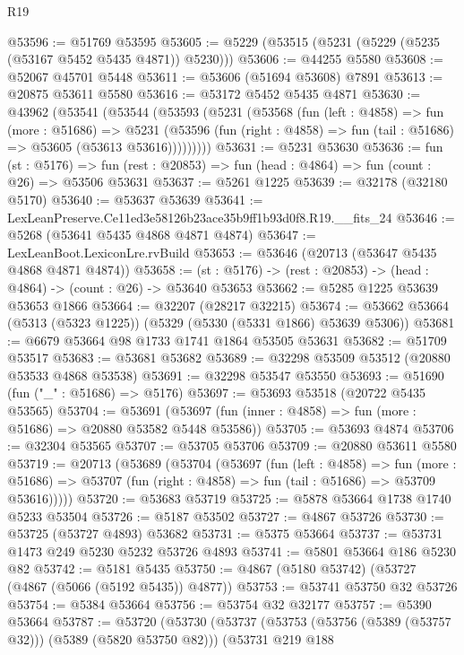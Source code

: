 \begin{lexlean}{R19}
\begin{coremodule}
@53596 := @51769 @53595
@53605 := @5229 (@53515 (@5231 (@5229 (@5235 (@53167 @5452 @5435 @4871)) @5230)))
@53606 := @44255 @5580
@53608 := @52067 @45701 @5448
@53611 := @53606 (@51694 @53608) @7891
@53613 := @20875 @53611 @5580
@53616 := @53172 @5452 @5435 @4871
@53630 := @43962
    (@53541
      (@53544
        (@53593
          (@5231
            (@53568
              (fun (left : @4858) =>
              fun (more : @51686) =>
              @5231
                (@53596
                  (fun (right : @4858) => fun (tail : @51686) => @53605 (@53613 @53616)))))))))
@53631 := @5231 @53630
@53636 := fun (st : @5176) =>
  fun (rest : @20853) => fun (head : @4864) => fun (count : @26) => @53506 @53631
@53637 := @5261 @1225
@53639 := @32178 (@32180 @5170)
@53640 := @53637 @53639
@53641 := LexLeanPreserve.Ce11ed3e58126b23ace35b9ff1b93d0f8.R19.__fits_24
@53646 := @5268 (@53641 @5435 @4868 @4871 @4874)
@53647 := LexLeanBoot.LexiconLre.rvBuild
@53653 := @53646 (@20713 (@53647 @5435 @4868 @4871 @4874))
@53658 := (st : @5176) -> (rest : @20853) -> (head : @4864) -> (count : @26) -> @53640 @53653
@53662 := @5285 @1225 @53639 @53653 @1866
@53664 := @32207 (@28217 @32215)
@53674 := @53662 @53664 (@5313 (@5323 @1225)) (@5329 (@5330 (@5331 @1866) @53639 @5306))
@53681 := @6679 @53664 @98 @1733 @1741 @1864 @53505 @53631
@53682 := @51709 @53517
@53683 := @53681 @53682
@53689 := @32298 @53509 @53512 (@20880 @53533 @4868 @53538)
@53691 := @32298 @53547 @53550
@53693 := @51690 (fun ("_" : @51686) => @5176)
@53697 := @53693 @53518 (@20722 @5435 @53565)
@53704 := @53691 (@53697 (fun (inner : @4858) => fun (more : @51686) => @20880 @53582 @5448 @53586))
@53705 := @53693 @4874
@53706 := @32304 @53565
@53707 := @53705 @53706
@53709 := @20880 @53611 @5580
@53719 := @20713
    (@53689
      (@53704
        (@53697
          (fun (left : @4858) =>
          fun (more : @51686) =>
          @53707 (fun (right : @4858) => fun (tail : @51686) => @53709 @53616)))))
@53720 := @53683 @53719
@53725 := @5878 @53664 @1738 @1740 @5233 @53504
@53726 := @5187 @53502
@53727 := @4867 @53726
@53730 := @53725 (@53727 @4893) @53682
@53731 := @5375 @53664
@53737 := @53731 @1473 @249 @5230 @5232 @53726 @4893
@53741 := @5801 @53664 @186 @5230 @82
@53742 := @5181 @5435
@53750 := @4867 (@5180 @53742) (@53727 (@4867 (@5066 (@5192 @5435)) @4877))
@53753 := @53741 @53750 @32 @53726
@53754 := @5384 @53664
@53756 := @53754 @32 @32177
@53757 := @5390 @53664
@53787 := @53720
    (@53730
      (@53737
        (@53753 (@53756 (@5389 (@53757 @32))) (@5389 (@5820 @53750 @82)))
        (@53731
          @219
          @188

\end{coremodule}
\end{lexlean}
